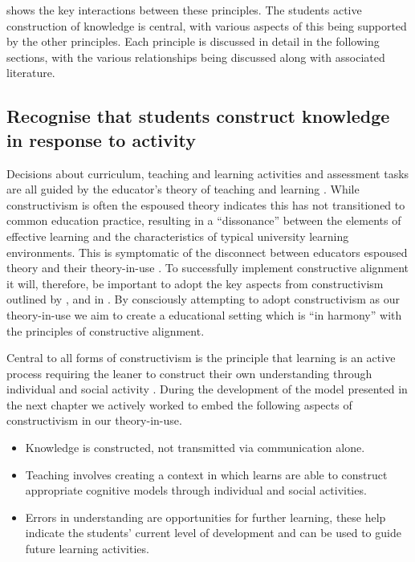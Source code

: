  shows the key interactions between these principles. The students active construction of knowledge is central, with various aspects of this being supported by the other principles. Each principle is discussed in detail in the following sections, with the various relationships being discussed along with associated literature.

\bigskip
\subsection{Recognise that students construct knowledge in response to activity} %
\label{ssub:ideas_adopted_from_constructivism}

Decisions about curriculum, teaching and learning activities and assessment tasks are all guided by the educator's theory of teaching and learning \cite{Argyris:1976,Ramsden:1992}. While constructivism is often the espoused theory \citet{Phillips:2005} indicates this has not transitioned to common education practice, resulting in a ``dissonance'' between the elements of effective learning and the characteristics of typical university learning environments. This is symptomatic of the disconnect between educators espoused theory and their theory-in-use \cite{Argyris:1976}. To successfully implement constructive alignment it will, therefore, be important to adopt the key aspects from constructivism outlined by \citet{Biggs:1996c}, \citet{Biggs:1997} and in \citet{Biggs:2007}. By consciously attempting to adopt constructivism as our theory-in-use we aim to create a educational setting which is ``in harmony'' with the principles of constructive alignment.

Central to all forms of constructivism is the principle that learning is an active process requiring the leaner to construct their own understanding through individual and social activity \cite{Biggs:1996c,Cunningham:1996,Duffy:1992,Glasersfeld:1989,Steffe:1995}. During the development of the model presented in the next chapter we actively worked to embed the following aspects of constructivism in our theory-in-use.

\begin{itemize}
	\item Knowledge is constructed, not transmitted via communication alone.
	\item Teaching involves creating a context in which learns are able to construct appropriate cognitive models through individual and social activities.
	\item Errors in understanding are opportunities for further learning, these help indicate the students' current level of development and can be used to guide future learning activities.
\end{itemize}

